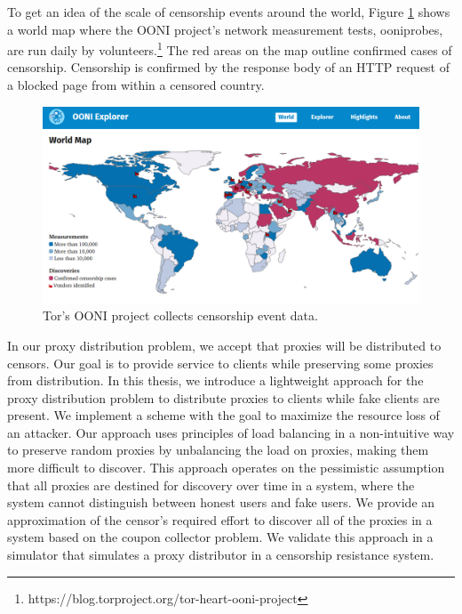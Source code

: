 To get an idea of the scale of censorship events around the world, Figure \ref{fig:oonimap} shows a world map where the OONI project's network measurement tests, ooniprobes, are run daily by volunteers.\footnote{https://blog.torproject.org/tor-heart-ooni-project} The red areas on the map outline confirmed cases of censorship. Censorship is confirmed by the response body of an HTTP request of a blocked page from within a censored country.

\begin{figure}[h!]
\centering
     \includegraphics[width=1.0\textwidth]{fig/ooni_map.png}
    \caption{Tor's OONI project collects censorship event data.}
    
    \label{fig:oonimap}
\end{figure}

In our proxy distribution problem, we accept that proxies will be distributed to censors. Our goal is to provide service to clients while preserving some proxies from distribution. In this thesis, we introduce a lightweight approach for the proxy distribution problem to distribute proxies to clients while fake clients are present. We implement a scheme with the goal to maximize the resource loss of an attacker. Our approach uses principles of load balancing in a non-intuitive way to preserve random proxies by unbalancing the load on proxies, making them more difficult to discover. This approach operates on the pessimistic assumption that all proxies are destined for discovery over time in a system, where the system cannot distinguish between honest users and fake users. 
We provide an approximation of the censor's required effort to discover all of the proxies in a system based on the coupon collector problem\cite{flajolet1992birthday}. We validate this approach in a simulator that simulates a proxy distributor in a censorship resistance system. 

